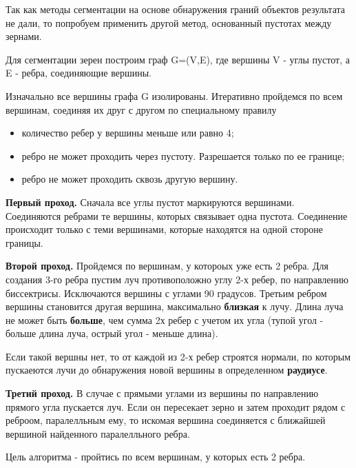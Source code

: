 \documentclass[a4paper, 14pt]{article}
\begin{document}
	Так как методы сегментации на основе обнаружения граний объектов результата не дали, 
	то попробуем применить другой метод, основанный пустотах между зернами.
	
	Для сегментации зерен построим граф G=(V,E), где вершины V - углы пустот, а E - ребра, соединяющие вершины. 
	
	Изначально все вершины графа G изолированы. Итеративно пройдемся по всем вершинам, соединяя их друг с другом по специальному правилу
	
	\begin{itemize}
		\item количество ребер у вершины меньше или равно 4;
		
		\item ребро не может проходить через пустоту. Разрешается только по ее границе;
		

		\item ребро не может проходить сквозь другую вершину.
		
	\end{itemize}
	
	\textbf{Первый проход.}
	Сначала все углы пустот маркируются вершинами. Соединяются ребрами те вершины, 
	которых связывает одна пустота. Соединение происходит только с теми вершинами,
	 которые находятся на одной стороне границы. 
	
	\textbf{Второй проход.}  
	Пройдемся по вершинам, у котороых уже есть 2 ребра. Для создания 3-го ребра пустим луч  противоположно углу 
	2-х ребер, по направлению биссектрисы. Исключаются вершины с углами 90 градусов. Третьим ребром вершины становится другая вершина, максимально \textbf{близкая} к лучу. Длина луча не может быть \textbf{больше}, чем сумма 2х ребер с учетом их угла (тупой угол
	- больше длина луча, острый угол - меньше длина).
	
	Если такой вершны нет, то от каждой из 2-х ребер строятся нормали, по которым пускаеются лучи до
	обнаружения новой вершины в определенном \textbf{раудиусе}.
	
	
	\textbf {Третий проход.} В случае с прямыми углами из вершины по направлению прямого угла пускается луч. Если он пересекает зерно и затем проходит 
	рядом с реброом, паралелльным ему, то искомая вершина соединяется с ближайшей вершиной найденного паралелльного ребра.
	
	Цель алгоритма - пройтись по всем вершинам, у которых есть 2 ребра. 
	
\end{document}
